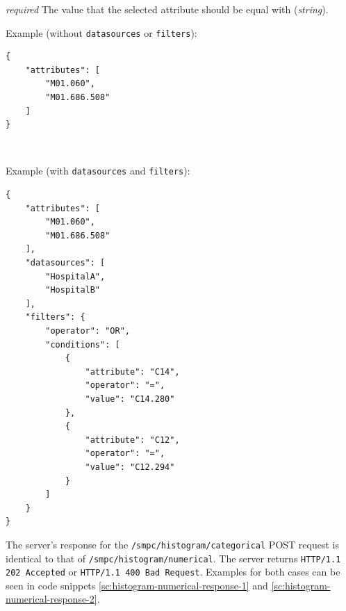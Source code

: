 \begin{description}[labelwidth=5em, leftmargin=\dimexpr\labelwidth+\labelsep\relax]
\begin{description}[labelwidth=6em, leftmargin=\dimexpr\labelwidth+\labelsep\relax]
\begin{description}[labelwidth=6em, leftmargin=\dimexpr\labelwidth+\labelsep\relax]
\begin{description}[labelwidth=5em, leftmargin=\dimexpr\labelwidth+\labelsep\relax]
            \item[\texttt{value}:] {\color{red}\textit{required}} The value that the selected attribute should be equal with (\textit{string}).
        \end{description}

    \end{description}
\end{description}

\begin{minipage}{\linewidth}
  Example (without \texttt{datasources} or \texttt{filters}):
{
\begin{verbatim}
{
    "attributes": [
        "M01.060",
        "M01.686.508"
    ]
}
\end{verbatim}
\label{sc:histogram-categorical-post-1}
}
\end{minipage}
\ \\
\begin{minipage}{\linewidth}
  Example (with \texttt{datasources} and \texttt{filters}):
{
\begin{verbatim}
{
    "attributes": [
        "M01.060",
        "M01.686.508"
    ],
    "datasources": [
        "HospitalA",
        "HospitalB"
    ],
    "filters": {
        "operator": "OR",
        "conditions": [
            {
                "attribute": "C14",
                "operator": "=",
                "value": "C14.280"
            },
            {
                "attribute": "C12",
                "operator": "=",
                "value": "C12.294"
            }
        ]
    }
}
\end{verbatim}
\label{sc:histogram-categorical-post-2}
}
\end{minipage}

\item[Response:] The server's response for the \texttt{/smpc/histogram/categorical} POST request is identical to that of \texttt{/smpc/histogram/numerical}. The server returns \texttt{HTTP/1.1 202 Accepted} or \texttt{HTTP/1.1 400 Bad Request}. Examples for both cases can be seen in code snippets \ref{sc:histogram-numerical-response-1} and \ref{sc:histogram-numerical-response-2}.
 \end{description}



